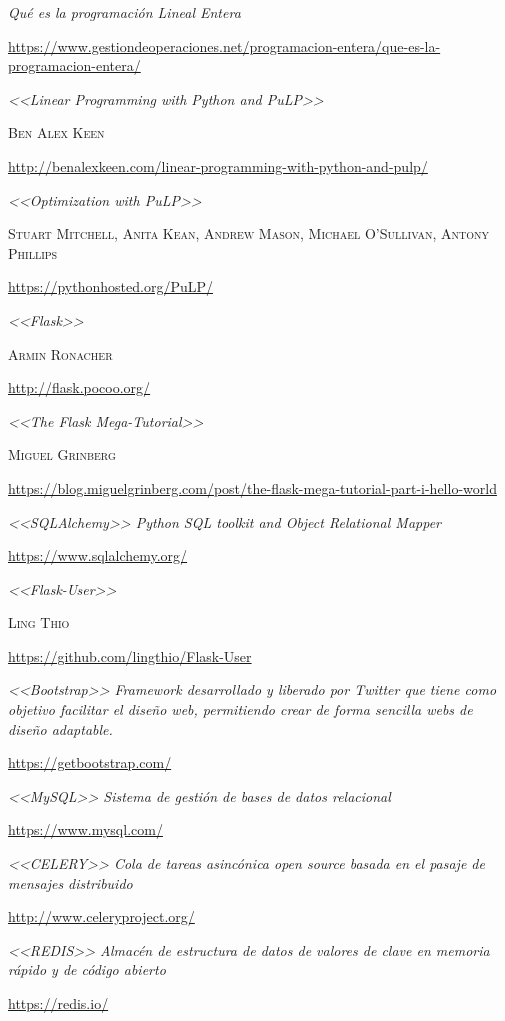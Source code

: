 \documentclass[a4paper]{article}
\begin{document}
\begin{thebibliography}{X}
 \textit{Qué es la programación Lineal Entera}

\url{https://www.gestiondeoperaciones.net/programacion-entera/que-es-la-programacion-entera/}


 \textit{<<Linear Programming with Python and PuLP>>}

\textsc{Ben Alex Keen}

\url{http://benalexkeen.com/linear-programming-with-python-and-pulp/}


 \textit{<<Optimization with PuLP>>}

\textsc{Stuart Mitchell, Anita Kean, Andrew Mason, Michael O’Sullivan, Antony Phillips}

\url{https://pythonhosted.org/PuLP/}


 \textit{<<Flask>>}

\textsc{Armin Ronacher}

\url{http://flask.pocoo.org/}


 \textit{<<The Flask Mega-Tutorial>>}

\textsc{Miguel Grinberg}

\url{https://blog.miguelgrinberg.com/post/the-flask-mega-tutorial-part-i-hello-world}

 \textit{<<SQLAlchemy>> Python SQL toolkit and Object Relational Mapper}

\url{https://www.sqlalchemy.org/}

 \textit{<<Flask-User>>}

\textsc{Ling Thio}

\url{https://github.com/lingthio/Flask-User}


 \textit{<<Bootstrap>> Framework desarrollado y liberado por Twitter que tiene como objetivo facilitar el diseño web, permitiendo crear de forma sencilla webs de diseño adaptable.}

\url{https://getbootstrap.com/}


 \textit{<<MySQL>> Sistema de gestión de bases de datos relacional}

\url{https://www.mysql.com/}


 \textit{<<CELERY>> Cola de tareas asincónica open source basada en el pasaje de mensajes distribuido}

\url{http://www.celeryproject.org/}


 \textit{<<REDIS>> Almacén de estructura de datos de valores de clave en memoria rápido y de código abierto}

\url{https://redis.io/}


\end{thebibliography}
\end{document}
